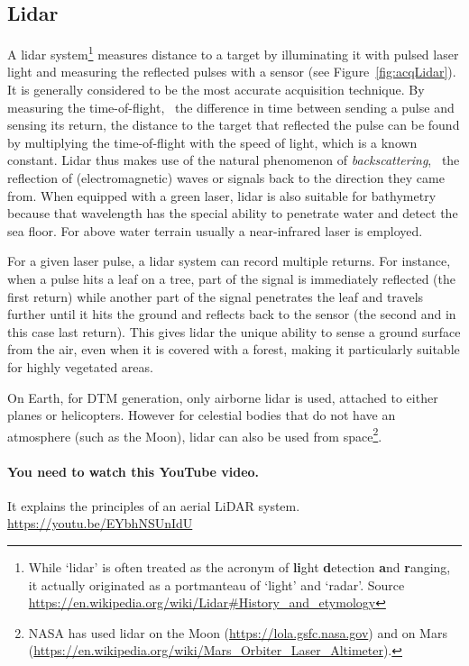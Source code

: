 \subsection{Lidar}
A lidar system\footnote{While `lidar' is often treated as the acronym of \textbf{li}ght \textbf{d}etection \textbf{a}nd \textbf{r}anging, it actually originated as a portmanteau of `light' and `radar'. Source \url{https://en.wikipedia.org/wiki/Lidar\#History\_and\_etymology}} measures distance to a target by illuminating it with pulsed laser light and measuring the reflected pulses with a sensor (see Figure~\ref{fig:acqLidar}). 
It is generally considered to be the most accurate acquisition technique.
By measuring the time-of-flight, \ie\ the difference in time between sending a pulse and sensing its return, the distance to the target that reflected the pulse can be found by multiplying the time-of-flight with the speed of light, which is a known constant.
Lidar thus makes use of the natural phenomenon of \emph{backscattering}, \ie\ the reflection of (electromagnetic) waves or signals back to the direction they came from. 
When equipped with a green laser, lidar is also suitable for bathymetry because that wavelength has the special ability to penetrate water and detect the sea floor. For above water terrain usually a near-infrared laser is employed.

For a given laser pulse, a lidar system can record multiple returns. 
For instance, when a pulse hits a leaf on a tree, part of the signal is immediately reflected (the first return) while another part of the signal penetrates the leaf and travels further until it hits the ground and reflects back to the sensor (the second and in this case last return).  
This gives lidar the unique ability to sense a ground surface from the air, even when it is covered with a forest, making it particularly suitable for highly vegetated areas.

On Earth, for DTM generation, only airborne lidar is used, attached to either planes or helicopters.
However for celestial bodies that do not have an atmosphere (such as the Moon), lidar can also be used from space\footnote{NASA has used lidar on the Moon (\url{https://lola.gsfc.nasa.gov}) and on Mars (\url{https://en.wikipedia.org/wiki/Mars_Orbiter_Laser_Altimeter}).}.

\begin{practical-stuff}
	\paragraph{You need to watch this YouTube video.}
	It explains the principles of an aerial LiDAR system.
	\\
	\url{https://youtu.be/EYbhNSUnIdU}
\end{practical-stuff}


